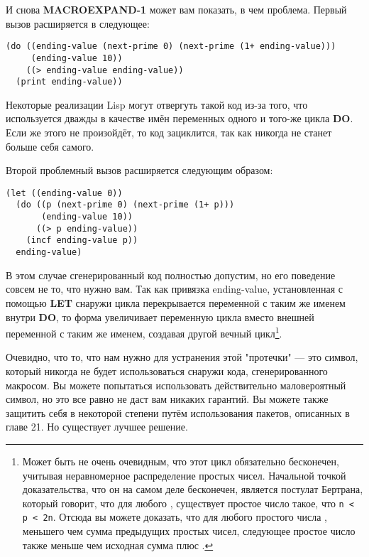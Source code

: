И снова \textbf{MACROEXPAND-1} может вам показать, в чем проблема. Первый вызов
расширяется в следующее:

\begin{lstlisting}
(do ((ending-value (next-prime 0) (next-prime (1+ ending-value)))
     (ending-value 10))
    ((> ending-value ending-value))
  (print ending-value))
\end{lstlisting}

Некоторые реализации Lisp могут отвергуть такой код из-за того, что 
используется дважды в качестве имён переменных одного и того-же цикла \textbf{DO}. Если же
этого не произойдёт, то код зациклится, так как  никогда не станет
больше себя самого.

Второй проблемный вызов расширяется следующим образом:

\begin{lstlisting}
(let ((ending-value 0))
  (do ((p (next-prime 0) (next-prime (1+ p)))
       (ending-value 10))
      ((> p ending-value))
    (incf ending-value p))
  ending-value)
\end{lstlisting}

В этом случае сгенерированный код полностью допустим, но его поведение совсем не то, что
нужно вам. Так как привязка ending-value, установленная с помощью \textbf{LET} снаружи
цикла перекрывается переменной с таким же именем внутри \textbf{DO}, то форма  увеличивает переменную цикла  вместо внешней
переменной с таким же именем, создавая другой вечный цикл\footnote{Может быть не очень
  очевидным, что этот цикл обязательно бесконечен, учитывая неравномерное распределение
  простых чисел. Начальной точкой доказательства, что он на самом деле бесконечен,
  является постулат Бертрана, который говорит, что для любого , существует
  простое число  такое, что \lstinline!n < p < 2n!. Отсюда вы можете доказать, что
  для любого простого числа , меньшего чем сумма предыдущих простых чисел,
  следующее простое число  также меньше чем исходная сумма плюс .}.

Очевидно, что то, что нам нужно для устранения этой "протечки" --- это символ, который
никогда не будет использоваться снаружи кода, сгенерированного макросом. Вы можете
попытаться использовать действительно маловероятный символ, но это все равно не даст вам
никаких гарантий. Вы можете также защитить себя в некоторой степени путём использования
пакетов, описанных в главе 21. Но существует лучшее решение.

